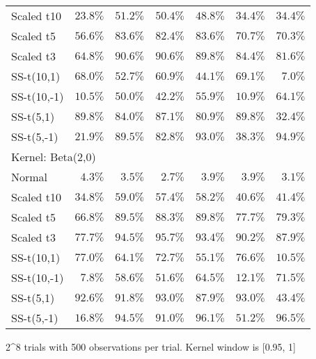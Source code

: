 \begin{longtable}{lrrrrrr}
Scaled t10 & $23.8\%$ & $51.2\%$ & $50.4\%$ & $48.8\%$ & $34.4\%$ & $34.4\%$ \\ 
Scaled t5 & $56.6\%$ & $83.6\%$ & $82.4\%$ & $83.6\%$ & $70.7\%$ & $70.3\%$ \\ 
Scaled t3 & $64.8\%$ & $90.6\%$ & $90.6\%$ & $89.8\%$ & $84.4\%$ & $81.6\%$ \\ 
SS-t(10,1) & $68.0\%$ & $52.7\%$ & $60.9\%$ & $44.1\%$ & $69.1\%$ & $7.0\%$ \\ 
SS-t(10,-1) & $10.5\%$ & $50.0\%$ & $42.2\%$ & $55.9\%$ & $10.9\%$ & $64.1\%$ \\ 
SS-t(5,1) & $89.8\%$ & $84.0\%$ & $87.1\%$ & $80.9\%$ & $89.8\%$ & $32.4\%$ \\ 
SS-t(5,-1) & $21.9\%$ & $89.5\%$ & $82.8\%$ & $93.0\%$ & $38.3\%$ & $94.9\%$ \\ 
\midrule
\multicolumn{7}{l}{Kernel: Beta(2,0)} \\ 
\midrule
Normal & $4.3\%$ & $3.5\%$ & $2.7\%$ & $3.9\%$ & $3.9\%$ & $3.1\%$ \\ 
Scaled t10 & $34.8\%$ & $59.0\%$ & $57.4\%$ & $58.2\%$ & $40.6\%$ & $41.4\%$ \\ 
Scaled t5 & $66.8\%$ & $89.5\%$ & $88.3\%$ & $89.8\%$ & $77.7\%$ & $79.3\%$ \\ 
Scaled t3 & $77.7\%$ & $94.5\%$ & $95.7\%$ & $93.4\%$ & $90.2\%$ & $87.9\%$ \\ 
SS-t(10,1) & $77.0\%$ & $64.1\%$ & $72.7\%$ & $55.1\%$ & $76.6\%$ & $10.5\%$ \\ 
SS-t(10,-1) & $7.8\%$ & $58.6\%$ & $51.6\%$ & $64.5\%$ & $12.1\%$ & $71.5\%$ \\ 
SS-t(5,1) & $92.6\%$ & $91.8\%$ & $93.0\%$ & $87.9\%$ & $93.0\%$ & $43.4\%$ \\ 
SS-t(5,-1) & $16.8\%$ & $94.5\%$ & $91.0\%$ & $96.1\%$ & $51.2\%$ & $96.5\%$ \\ 
\bottomrule
\end{longtable}
\begin{minipage}{\linewidth}
2\textasciicircum{}8 trials with 500 observations per trial. Kernel window is [0.95, 1]\\
\end{minipage}

